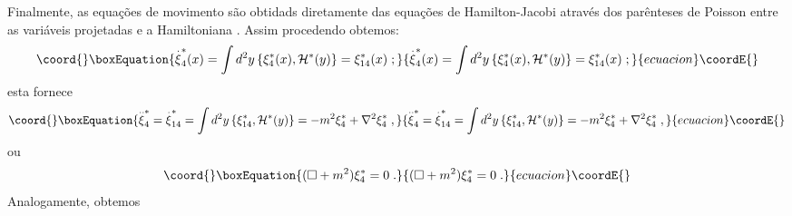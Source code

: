 \documentclass[a4paper,thmsa,12pt]{report}
\begin{document}
Finalmente, as equa\c{c}\~{o}es de movimento s\~{a}o obtidads diretamente
das equa\c{c}\~{o}es de Hamilton-Jacobi atrav\'{e}s dos par\^{e}nteses de
Poisson entre as vari\'{a}veis projetadas e a Hamiltoniana \coordHE{}. Assim procedendo obtemos: 
\begin{equation}\coord{}\boxEquation{
{\stackrel{.}{\xi }}_{4}^{\ast }(x)=\int d^{2}y\left\{ \xi _{4}^{\ast }(x),
\mathcal{H}^{\ast }(y)\right\} =\xi _{14}^{\ast }(x)\;;  \label{364}
}{
{\stackrel{.}{\xi }}_{4}^{\ast }(x)=\int d^{2}y\left\{ \xi _{4}^{\ast }(x),
\mathcal{H}^{\ast }(y)\right\} =\xi _{14}^{\ast }(x)\;;  }{ecuacion}\coordE{}\end{equation}
esta fornece 
\begin{equation}\coord{}\boxEquation{
{\stackrel{..}{\xi }}_{4}^{\ast }={\stackrel{.}{\xi }}_{14}^{\ast }=\int
d^{2}y\left\{ \xi _{14}^{\ast },\mathcal{H}^{\ast }(y)\right\} =-m^{2}\xi
_{4}^{\ast }+\nabla ^{2}\xi _{4}^{\ast }\;,  \label{365}
}{
{\stackrel{..}{\xi }}_{4}^{\ast }={\stackrel{.}{\xi }}_{14}^{\ast }=\int
d^{2}y\left\{ \xi _{14}^{\ast },\mathcal{H}^{\ast }(y)\right\} =-m^{2}\xi
_{4}^{\ast }+\nabla ^{2}\xi _{4}^{\ast }\;,  }{ecuacion}\coordE{}\end{equation}
ou 
\begin{equation}\coord{}\boxEquation{
(\square +m^{2})\xi _{4}^{\ast }=0\;.  \label{366}
}{
(\square +m^{2})\xi _{4}^{\ast }=0\;.  }{ecuacion}\coordE{}\end{equation}
Analogamente, obtemos 
\end{document}
